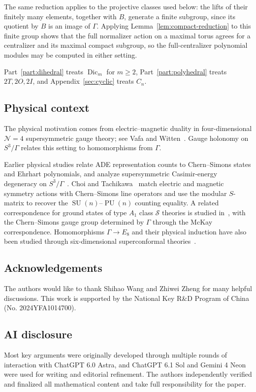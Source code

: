 \documentclass[11pt,a4paper,reqno]{amsart}
\theoremstyle{plain}
\theoremstyle{definition}
\theoremstyle{remark}
\numberwithin{equation}{section}
\newcommand{\SU}{\operatorname{SU}}
\newcommand{\Dic}{\operatorname{Dic}}
\begin{document}
The same reduction applies to the projective classes used below: the lifts of their finitely many elements, together with $B$, generate a finite subgroup, since its quotient by $B$ is an image of $\Gamma$. Applying Lemma~\ref{lem:compact-reduction} to this finite group shows that the full normalizer action on a maximal torus agrees for a centralizer and its maximal compact subgroup, so the full-centralizer polynomial modules may be computed in either setting.

Part~\ref{part:dihedral} treats $\Dic_m$ for $m\ge2$, Part~\ref{part:polyhedral} treats $2T,2O,2I$, and Appendix~\ref{sec:cyclic} treats $C_n$.

\subsection{Physical context}

The physical motivation comes from electric--magnetic duality in four-dimensional $\mathcal N=4$ supersymmetric gauge theory; see Vafa and Witten~\cite{vafa-witten}. Gauge holonomy on $S^3/\Gamma$ relates this setting to homomorphisms from $\Gamma$.

Earlier physical studies relate ADE representation counts to Chern--Simons states and Ehrhart polynomials, and analyze supersymmetric Casimir-energy degeneracy on $S^3/\Gamma$~\cite{JuEhrhart,JuCasimir}. Choi and Tachikawa~\cite[\S\S4.3--4.4]{CT} match electric and magnetic symmetry actions with Chern--Simons line operators and use the modular $S$-matrix to recover the $\SU(n)$--$\operatorname{PU}(n)$ counting equality. A related correspondence for ground states of type $A_1$ class $\mathcal S$ theories is studied in~\cite{AVGJ}, with the Chern--Simons gauge group determined by $\Gamma$ through the McKay correspondence. Homomorphisms $\Gamma\to E_8$ and their physical induction have also been studied through six-dimensional superconformal theories~\cite{FR,BZ}.

\subsection{Acknowledgements}
The authors would like to thank Shihao Wang and Zhiwei Zheng for many helpful discussions. This work is supported by the National Key R\&D Program of China (No. 2024YFA1014700).

\subsection{AI disclosure}
Most key arguments were originally developed through multiple rounds of interaction with ChatGPT 6.0 Astra, and ChatGPT 6.1 Sol and Gemini 4 Neon were used for writing and editorial refinement. The authors independently verified and finalized all mathematical content and take full responsibility for the paper.
\end{document}
